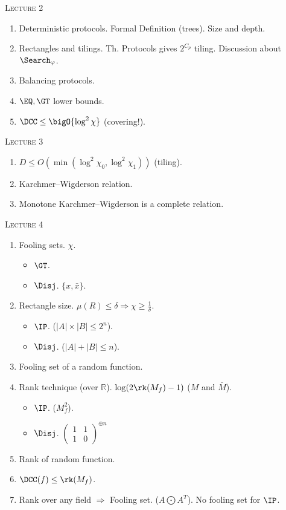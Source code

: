 \centerline{\textsc{Lecture 2}}

\begin{enumerate}
    \item Deterministic protocols. Formal Definition (trees). Size and depth.
    \item Rectangles and tilings. Th. Protocols gives $2^{C_p}$ tiling.
        Discussion about $\Search_{\varphi}$.
    \item Balancing protocols.
    \item $\EQ, \GT$ lower bounds.
    \item $\DCC \le \bigO{\log^2 \chi}$ (covering!).
\end{enumerate}


\centerline{\textsc{Lecture 3}}

\begin{enumerate}
    \item $D \le O(\min( \log^2 \chi_0, \log^2 \chi_1))$ (tiling).
    \item Karchmer--Wigderson relation.
    \item Monotone Karchmer--Wigderson is a complete relation.
\end{enumerate}

\centerline{\textsc{Lecture 4}}

\begin{enumerate}
    \item Fooling sets. $\chi$.
        \begin{itemize}
            \item $\GT$.
            \item $\Disj$. $\{x, \bar{x}\}$.
        \end{itemize}
    \item Rectangle size. $\mu(R) \le \delta \Rightarrow \chi \ge \frac{1}{\delta}$.
        \begin{itemize}
            \item $\IP$. ($|A| \times |B| \le 2^n$).
            \item $\Disj$. ($|A| + |B| \le n$).
        \end{itemize}
    \item Fooling set of a random function.
    \item Rank technique (over $\mathbb{R}$). $\log(2 \rk(M_f) - 1)$ ($M$ and $\bar{M}$).
        \begin{itemize}
            \item $\IP$. ($M_f^2$).
            \item $\Disj$.
                $\begin{pmatrix}
                    1 & 1\\
                    1 & 0
                \end{pmatrix}^{\oplus n}$
        \end{itemize}
    \item Rank of random function.
    \item $\DCC(f) \le \rk(M_f)$.
    \item Rank over any field $\Rightarrow$ Fooling set. ($A \bigodot A^T$). No fooling set for $\IP$.
\end{enumerate}



